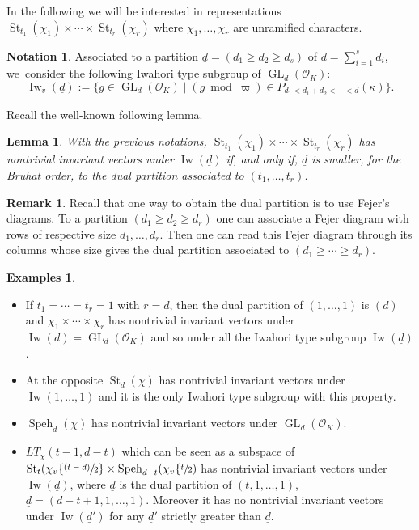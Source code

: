 \documentclass[JEP,XML,SOM,Unicode,published]{cedram}
\let\sep\mid
\newcommand{\psfrac}[2]{\sfrac{(#1)}{#2}}
\DeclareMathOperator{\GL}{GL}
\theoremstyle{plain}
\newtheorem{lemma}[equation]{Lemma}
\theoremstyle{definition}
\newtheorem*{remark}{Remark}
\newtheorem*{examples}{Examples}
\newtheorem{nota}[equation]{Notation}
\numberwithin{equation}{subsection}
\newcommand\OC{{\mathcal O}}
\DeclareMathOperator{\Iw}{Iw}
\DeclareMathOperator{\speh}{Speh}
\DeclareMathOperator{\st}{St}
\begin{document}
In the following we will be interested in representations
$\st_{t_1}(\chi_1) \times \cdots \times \st_{t_r}(\chi_r)$ where $\chi_1,\dots,
\chi_r$ are unramified characters.

\begin{nota} \label{nota-iwh0}
Associated to a partition $\underline d=(d_1 \geq d_2 \geq d_s)$ of
$d=\sum_{i=1}^s d_i$, we~consider the following Iwahori type subgroup of
$\GL_d(\OC_K)$:
\[
\Iw_v(\underline d):=
\bigl \{g \in \GL_d(\OC_K) \sep (g \bmod \varpi) \in
P_{d_1 < d_1+d_2 < \cdots < d}(\kappa) \bigr\}.
\]
\end{nota}

Recall the well-known following lemma.

\begin{lemma} \label{lem-iwahori}
With the previous notations,
$\st_{t_1}(\chi_1) \times \cdots \times \st_{t_r}(\chi_r)$ has nontrivial
invariant vectors under $\Iw(\underline d)$ if, and only if, $\underline d$
is smaller, for the Bruhat order, to the dual partition associated to
$(t_1,\dots,t_r)$.
\end{lemma}

\begin{remark}
Recall that one way to obtain the dual partition is to use Fejer's diagrams.
To a partition $(d_1 \geq d_2 \geq d_r)$ one can associate a Fejer diagram
with rows of respective size $d_1,\dots,d_r$. Then one can read this Fejer diagram
through its columns whose size gives the dual partition associated to
$(d_1 \geq \cdots \geq d_r)$.
\end{remark}

\skpt
\begin{examples}
\begin{itemize}
\item If $t_1=\cdots=t_r=1$ with $r=d$, then the dual partition of
$(1,\dots,1)$ is $(d)$ and $\chi_1 \times \cdots \times \chi_r$ has nontrivial
invariant vectors under $\Iw(d)=\GL_d(\OC_K)$ and so under all the
Iwahori type subgroup $\Iw(\underline d)$.

\item At the opposite $\st_d(\chi)$ has nontrivial invariant vectors under
$\Iw(1,\dots,1)$ and it is the only Iwahori type subgroup with this property.

\item $\speh_d(\chi)$ has nontrivial invariant vectors under $\GL_d(\OC_K)$.

\item $LT_{\chi}(t-1,d-t)$ which can be seen as a subspace of
$\st_t(\chi_v \{\psfrac{t-d}{2}\} \times \speh_{d-t}(\chi_v \{\sfrac{t}{2})$
has nontrivial invariant vectors under $\Iw(\underline d)$, where
$\underline d$ is the dual partition of $(t,1,\dots,1)$, \ie $\underline d=(d-t+1,1,\dots,1)$. Moreover it has no nontrivial invariant
vectors under $\Iw(\underline d')$ for any $\underline d'$ strictly greater
than $\underline d$.
\end{itemize}
\end{examples}
\end{document}

